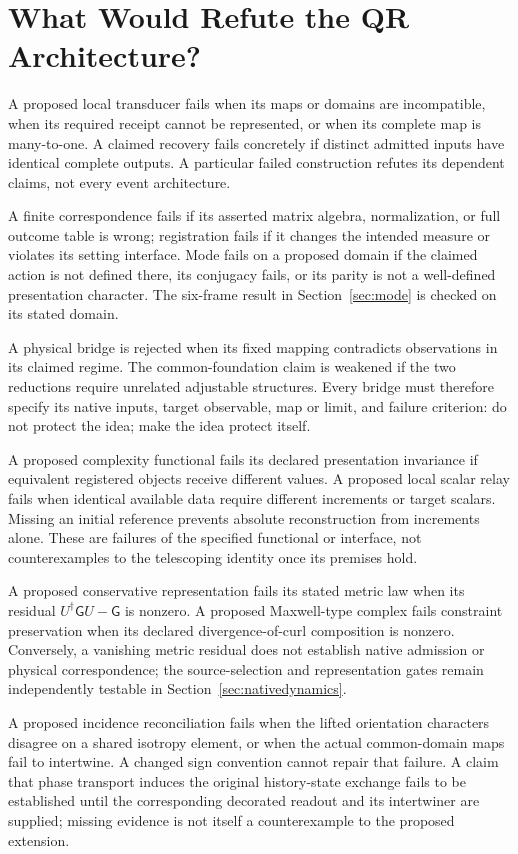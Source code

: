 \section{What Would Refute the QR Architecture?}\label{sec:failure}
A proposed local transducer fails when its maps or domains are incompatible, when its required receipt cannot be represented, or when its complete map is many-to-one. A claimed recovery fails concretely if distinct admitted inputs have identical complete outputs. A particular failed construction refutes its dependent claims, not every event architecture.

A finite correspondence fails if its asserted matrix algebra, normalization, or full outcome table is wrong; registration fails if it changes the intended measure or violates its setting interface. Mode fails on a proposed domain if the claimed action is not defined there, its conjugacy fails, or its parity is not a well-defined presentation character. The six-frame result in Section~\ref{sec:mode} is checked on its stated domain.

A physical bridge is rejected when its fixed mapping contradicts observations in its claimed regime. The common-foundation claim is weakened if the two reductions require unrelated adjustable structures. Every bridge must therefore specify its native inputs, target observable, map or limit, and failure criterion: do not protect the idea; make the idea protect itself.

A proposed complexity functional fails its declared presentation invariance if equivalent registered objects receive different values. A proposed local scalar relay fails when identical available data require different increments or target scalars. Missing an initial reference prevents absolute reconstruction from increments alone. These are failures of the specified functional or interface, not counterexamples to the telescoping identity once its premises hold.


A proposed conservative representation fails its stated metric law when its residual $U^\dagger\mathsf G U-\mathsf G$ is nonzero. A proposed Maxwell-type complex fails constraint preservation when its declared divergence-of-curl composition is nonzero. Conversely, a vanishing metric residual does not establish native admission or physical correspondence; the source-selection and representation gates remain independently testable in Section~\ref{sec:nativedynamics}.

A proposed incidence reconciliation fails when the lifted orientation characters disagree on a shared isotropy element, or when the actual common-domain maps fail to intertwine. A changed sign convention cannot repair that failure. A claim that phase transport induces the original history-state exchange fails to be established until the corresponding decorated readout and its intertwiner are supplied; missing evidence is not itself a counterexample to the proposed extension.


